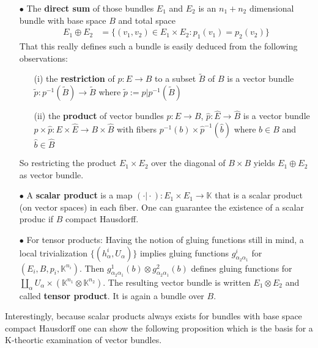 \begin{enumerate}
\item[$\bullet$]
  The \textbf{direct sum} of those bundles $E_{1}$ and $E_{2}$ is an $n_{1} + n_{2}$ dimensional bundle with base space $B$ and total space
\begin{align*}
  E_{1} \oplus E_{2}
  &=
  \lbrace
      (v_{1},v_{2})
      \in
      E_{1}
      \times
      E_{2}
    \colon
      p_{1}(v_{1})
      =
      p_{2}(v_{2})
  \rbrace
\end{align*}
That this really defines such a bundle is easily deduced from the following observations:
\begin{enumerate}
\item[(i)]
the \textbf{restriction} of $p \colon E \to B$ to a subset $\tilde{B}$ of $B$ is a vector bundle $\tilde{p} \colon p^{-1}(\tilde{B}) \to \tilde{B}$ where $\tilde{p} := p \vert p^{-1}(\tilde{B})$
\item[(ii)]
the \textbf{product} of vector bundles $p \colon E \to B$, $\hat{p} \colon \hat{E} \to \hat{B}$ is a vector bundle $p \times \hat{p} \colon E \times \hat{E} \to B \times \hat{B}$ with fibers $p^{-1}(b) \times \hat{p}^{-1}(\hat{b})$ where $b \in B$ and $\hat{b} \in \hat{B}$
\end{enumerate}
So restricting the product $E_{1} \times E_{2}$ over the diagonal of $B \times B$ yields $E_{1} \oplus E_{2}$ as vector bundle.
\item[$\bullet$]
A \textbf{scalar product} is a map $(\cdot\vert\cdot) \colon E_{1} \times E_{1} \to \mathbb{K}$ that is a scalar product (on vector spaces) in each fiber. One can guarantee the existence of a scalar produc if $B$ compact Hausdorff.
\item[$\bullet$]
For tensor products: Having the notion of gluing functions still in mind, a local trivialization $\lbrace (h_{\alpha}^{i},U_{\alpha}) \rbrace$ implies gluing functions $g_{\alpha_{2}\alpha_{1}}^{i}$ for $(E_{i},B,p_{i},\mathbb{K}^{n_{i}})$. Then $g_{\alpha_{2}\alpha_{1}}^{1}(b) \otimes g_{\alpha_{2}\alpha_{1}}^{2}(b)$ defines gluing functions for $\coprod_{\alpha}U_{\alpha} \times (\mathbb{K}^{n_{1}} \otimes \mathbb{K}^{n_{2}})$. The resulting vector bundle is written $E_{1} \otimes E_{2}$ and called \textbf{tensor product}. It is again a bundle over $B$.
\end{enumerate}
Interestingly, because scalar products always exists for bundles with base space compact Hausdorff one can show the following proposition which is the basis for a K-theortic examination of vector bundles.
